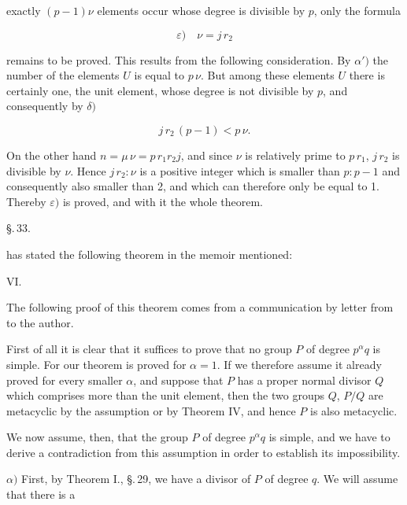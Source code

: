 exactly $(p-1)\nu$ elements occur whose degree is divisible by $p$, only the formula

\[ \varepsilon)\quad \nu = j\,r_2 \]

remains to be proved. This results from the following consideration. By $\alpha')$ the number of the elements $U$ is equal to $p\,\nu$. But among these elements $U$ there is certainly one, the unit element, whose degree is not divisible by $p$, and consequently by $\delta)$

\[ j\,r_2\,(p-1) < p\,\nu. \]

On the other hand $n = \mu\,\nu = p\,r_1 r_2 j$, and since $\nu$ is relatively prime to $p\,r_1$, $j\,r_2$ is divisible by $\nu$. Hence $j\,r_2 : \nu$ is a positive integer which is smaller than $p : p-1$ and consequently also smaller than 2, and which can therefore only be equal to 1. Thereby $\varepsilon)$ is proved, and with it the whole theorem.

\begin{center}
\S.\,33.

\end{center}

 has stated the following theorem in the memoir mentioned:

VI. 

The following proof of this theorem comes from a communication by letter from  to the author.

First of all it is clear that it suffices to prove that no group $P$ of degree $p^{\alpha} q$ is simple. For our theorem is proved for $\alpha = 1$. If we therefore assume it already proved for every smaller $\alpha$, and suppose that $P$ has a proper normal divisor $Q$ which comprises more than the unit element, then the two groups $Q$, $P/Q$ are metacyclic by the assumption or by Theorem IV, and hence $P$ is also metacyclic.

We now assume, then, that the group $P$ of degree $p^{\alpha} q$ is simple, and we have to derive a contradiction from this assumption in order to establish its impossibility.

$\alpha)$ First, by Theorem I., \S.\,29, we have a divisor of $P$ of degree $q$. We will assume that there is a
